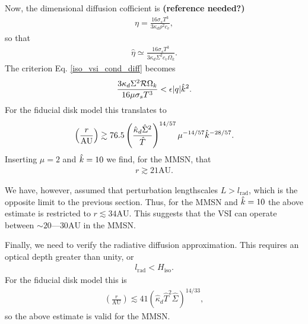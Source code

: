 Now, the dimensional diffusion cofficient is {\bf(reference needed?)}
\begin{align}
  \eta = \frac{16\sigma_s T^3}{3\kappa_d\rho^2 c_v}, 
\end{align}
so that
\begin{align}
  \hat{\eta} \simeq  \frac{16\sigma_s T^3}{3\kappa_d\Sigma^2
    c_v\Omega_k}. 
\end{align}
The criterion Eq. \ref{iso_vsi_cond_diff} becomes
\begin{align}
\frac{3\kappa_d\Sigma^2\mathcal{R}
  \Omega_k}{16\mu\sigma_s T^3} < \epsilon |q| \hat{k}^2. 
\end{align}
For the fiducial disk model this translates to
\begin{align}
  \left(\frac{r}{\mathrm{AU}}\right) \gtrsim
  76.5\left(\frac{\hat{\kappa}_d\hat{\Sigma}^2}{\hat{T}}\right)^{14/57}\mu^{-14/57}\hat{k}^{-28/57}. 
\end{align} 
Inserting $\mu=2$ and $\hat{k}=10$ we find, for the MMSN, that
\begin{align*}
  r\gtrsim 21 \mathrm{AU}. 
\end{align*}

We have, however, assumed that perturbation lengthscales
$L>l_\mathrm{rad}$, which is the opposite limit to the previous
section. Thus, for the MMSN and $\hat{k}=10$ the above estimate is
restricted to $r\lesssim 34\mathrm{AU}$. This suggests that the VSI
can operate between $\sim 20$---$30\mathrm{AU}$ in the MMSN. 

Finally, we need to verify the radiative diffusion approximation. This
requires an optical depth greater than unity, or
\begin{align}
  l_\mathrm{rad}< H_\mathrm{iso}. 
\end{align}
For the fiducial disk model this is
\begin{align}
  \left(\frac{r}{\mathrm{AU}}\right) \lesssim 41
  \left(\hat{\kappa}_d\hat{T}^2\hat{\Sigma}\right)^{14/33}, 
\end{align}
so the above estimate is valid for the MMSN. 

